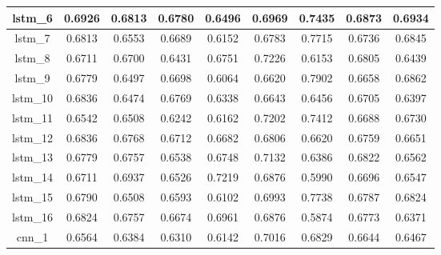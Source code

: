 \begin{table}[p]
\begin{tabular}{|c|c|c|c|c|c|c|c|c|}
        lstm\_6  & 0.6926                        & 0.6813                         & 0.6780                      & 0.6496                  & 0.6969 & 0.7435 & 0.6873 & 0.6934 \\ \hline
        lstm\_7  & 0.6813                        & 0.6553                         & 0.6689                      & 0.6152                  & 0.6783 & 0.7715 & 0.6736 & 0.6845 \\ \hline
        lstm\_8  & 0.6711                        & 0.6700                         & 0.6431                      & 0.6751                  & 0.7226 & 0.6153 & 0.6805 & 0.6439 \\ \hline
        lstm\_9  & 0.6779                        & 0.6497                         & 0.6698                      & 0.6064                  & 0.6620 & 0.7902 & 0.6658 & 0.6862 \\ \hline
        lstm\_10 & 0.6836                        & 0.6474                         & 0.6769                      & 0.6338                  & 0.6643 & 0.6456 & 0.6705 & 0.6397 \\ \hline
        lstm\_11 & 0.6542                        & 0.6508                         & 0.6242                      & 0.6162                  & 0.7202 & 0.7412 & 0.6688 & 0.6730 \\ \hline
        lstm\_12 & 0.6836                        & 0.6768                         & 0.6712                      & 0.6682                  & 0.6806 & 0.6620 & 0.6759 & 0.6651 \\ \hline
        lstm\_13 & 0.6779                        & 0.6757                         & 0.6538                      & 0.6748                  & 0.7132 & 0.6386 & 0.6822 & 0.6562 \\ \hline
        lstm\_14 & 0.6711                        & 0.6937                         & 0.6526                      & 0.7219                  & 0.6876 & 0.5990 & 0.6696 & 0.6547 \\ \hline
        lstm\_15 & 0.6790                        & 0.6508                         & 0.6593                      & 0.6102                  & 0.6993 & 0.7738 & 0.6787 & 0.6824 \\ \hline
        lstm\_16 & 0.6824                        & 0.6757                         & 0.6674                      & 0.6961                  & 0.6876 & 0.5874 & 0.6773 & 0.6371 \\ \hline
        cnn\_1   & 0.6564                        & 0.6384                         & 0.6310                      & 0.6142                  & 0.7016 & 0.6829 & 0.6644 & 0.6467 \\ \hline

\end{tabular}
\end{table}
